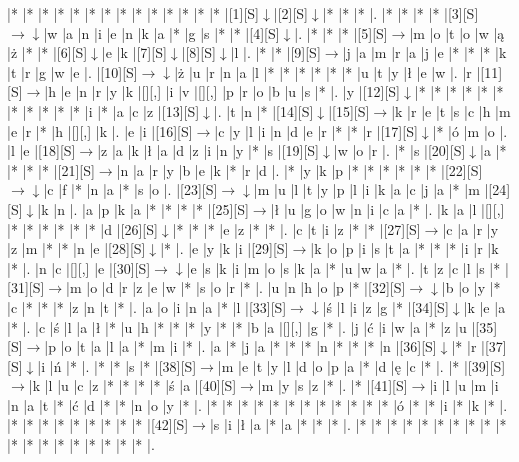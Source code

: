 \documentclass[11pt]{article}
\newcommand\drarr{$\rightarrow \!\!\!\!\! \downarrow$}
\newcommand\rarr{$\rightarrow$}
\newcommand\darr{$\downarrow$}
\begin{document}
\noindent\begin{Puzzle}{18}{29}|*	|*	|*	|*	|*	|*	|*	|*	|*	|*	|*	|*	|*	|*	|[1][S]\darr	|[2][S]\darr	|*	|*	|*	|.
|*	|*	|*	|*	|[3][S]\drarr	|w	|a	|n	|i	|e	|n	|k	|a	|*	|g	|s	|*	|*	|[4][S]\darr	|.
|*	|*	|*	|[5][S]\rarr	|m	|o	|t	|o	|w	|ą	|ż	|*	|*	|[6][S]\darr	|e	|k	|[7][S]\darr	|[8][S]\darr	|l	|.
|*	|*	|[9][S]\rarr	|j	|a	|m	|r	|a	|j	|e	|*	|*	|*	|k	|t	|r	|g	|w	|e	|.
|[10][S]\drarr	|ż	|u	|r	|n	|a	|l	|*	|*	|*	|*	|*	|*	|u	|t	|y	|ł	|e	|w	|.
|r	|[11][S]\rarr	|h	|e	|n	|r	|y	|k	|[][,]{ }	|i	|v	|[][,]{ }	|p	|r	|o	|b	|u	|s	|*	|.
|y	|[12][S]\darr	|*	|*	|*	|*	|*	|*	|*	|*	|*	|*	|*	|i	|*	|a	|c	|z	|[13][S]\darr	|.
|t	|n	|*	|[14][S]\darr	|[15][S]\rarr	|k	|r	|e	|t	|s	|c	|h	|m	|e	|r	|*	|h	|[][,]{ }	|k	|.
|e	|i	|[16][S]\rarr	|c	|y	|l	|i	|n	|d	|e	|r	|*	|*	|r	|[17][S]\darr	|*	|ó	|m	|o	|.
|l	|e	|[18][S]\rarr	|z	|a	|k	|ł	|a	|d	|z	|i	|n	|y	|*	|s	|[19][S]\darr	|w	|o	|r	|.
|*	|s	|[20][S]\darr	|a	|*	|*	|*	|*	|[21][S]\rarr	|n	|a	|r	|y	|b	|e	|k	|*	|r	|d	|.
|*	|y	|k	|p	|*	|*	|*	|*	|*	|*	|[22][S]\drarr	|c	|f	|*	|n	|a	|*	|s	|o	|.
|[23][S]\drarr	|m	|u	|l	|t	|y	|p	|l	|i	|k	|a	|c	|j	|a	|*	|m	|[24][S]\darr	|k	|n	|.
|a	|p	|k	|a	|*	|*	|*	|*	|[25][S]\rarr	|ł	|u	|g	|o	|w	|n	|i	|c	|a	|*	|.
|k	|a	|l	|[][,]{ }	|*	|*	|*	|*	|*	|*	|d	|[26][S]\darr	|*	|*	|*	|e	|z	|*	|*	|.
|c	|t	|i	|z	|*	|*	|[27][S]\rarr	|c	|a	|r	|y	|z	|m	|*	|*	|n	|e	|[28][S]\darr	|*	|.
|e	|y	|k	|i	|[29][S]\rarr	|k	|o	|p	|i	|s	|t	|a	|*	|*	|*	|i	|r	|k	|*	|.
|n	|c	|[][,]{ }	|e	|[30][S]\drarr	|e	|s	|k	|i	|m	|o	|s	|k	|a	|*	|u	|w	|a	|*	|.
|t	|z	|c	|l	|s	|*	|[31][S]\rarr	|m	|o	|d	|r	|z	|e	|w	|*	|s	|o	|r	|*	|.
|u	|n	|h	|o	|p	|*	|[32][S]\drarr	|b	|o	|y	|*	|c	|*	|*	|*	|z	|n	|t	|*	|.
|a	|o	|i	|n	|a	|*	|l	|[33][S]\drarr	|ś	|l	|i	|z	|g	|*	|[34][S]\darr	|k	|e	|a	|*	|.
|c	|ś	|l	|a	|ł	|*	|u	|h	|*	|*	|*	|y	|*	|*	|b	|a	|[][,]{ }	|g	|*	|.
|j	|ć	|i	|w	|a	|*	|z	|u	|[35][S]\rarr	|p	|o	|t	|a	|l	|a	|*	|m	|i	|*	|.
|a	|*	|j	|a	|*	|*	|*	|n	|*	|*	|*	|n	|[36][S]\darr	|*	|r	|[37][S]\darr	|i	|ń	|*	|.
|*	|*	|s	|*	|[38][S]\rarr	|m	|e	|t	|y	|l	|d	|o	|p	|a	|*	|d	|ę	|c	|*	|.
|*	|[39][S]\rarr	|k	|l	|u	|c	|z	|*	|*	|*	|*	|ś	|a	|[40][S]\rarr	|m	|y	|s	|z	|*	|.
|*	|[41][S]\rarr	|i	|l	|u	|m	|i	|n	|a	|t	|*	|ć	|d	|*	|*	|n	|o	|y	|*	|.
|*	|*	|*	|*	|*	|*	|*	|*	|*	|*	|*	|*	|ó	|*	|*	|i	|*	|k	|*	|.
|*	|*	|*	|*	|*	|*	|*	|*	|*	|[42][S]\rarr	|s	|i	|ł	|a	|*	|a	|*	|*	|*	|.
|*	|*	|*	|*	|*	|*	|*	|*	|*	|*	|*	|*	|*	|*	|*	|*	|*	|*	|*	|.\end{Puzzle}

\newpage
\end{document}
